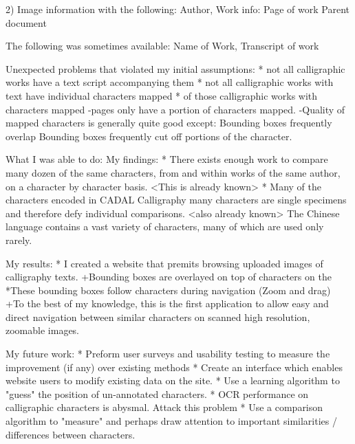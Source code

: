         2)  Image information with the following:
            Author,
            Work info:
                Page of work
                Parent document
            
            The following was sometimes available:
                Name of Work,
                Transcript of work
                
        
            














    Unexpected problems that violated my initial assumptions:
        * not all calligraphic works have a text script accompanying them
        * not all calligraphic works with text have individual characters mapped
        * of those calligraphic works with characters mapped
            -pages only have a portion of characters mapped.
            -Quality of mapped characters is generally quite good except:
                Bounding boxes frequently overlap
                Bounding boxes frequently cut off portions of the character.

What I was able to do:
    My findings:
        * There exists enough work to compare many dozen of the same characters, from and within works of the same author, on a character by character basis. <This is already known>
        *  Many of the characters encoded in CADAL Calligraphy many characters are single specimens and therefore defy individual comparisons.  <also already known>  The Chinese language contains a vast variety of characters, many of which are used only rarely.
    
    My results:
        *  I created a website that premits browsing uploaded images of calligraphy texts.
            +Bounding boxes are overlayed on top of characters on the 
                *These bounding boxes follow characters during navigation (Zoom and drag)
            +To the best of my knowledge, this is the first application to allow easy and direct navigation between similar characters on scanned high resolution, zoomable images.


    My future work:
        *  Preform user surveys and usability testing to measure the improvement (if any) over existing methods
        *  Create an interface which enables website users to modify existing data on the site.
        *  Use a learning algorithm to "guess" the position of un-annotated characters.
        *  OCR performance on calligraphic characters is abysmal.  Attack this problem
        *  Use a comparison algorithm to "measure" and perhaps draw attention to important similarities / differences between characters.




